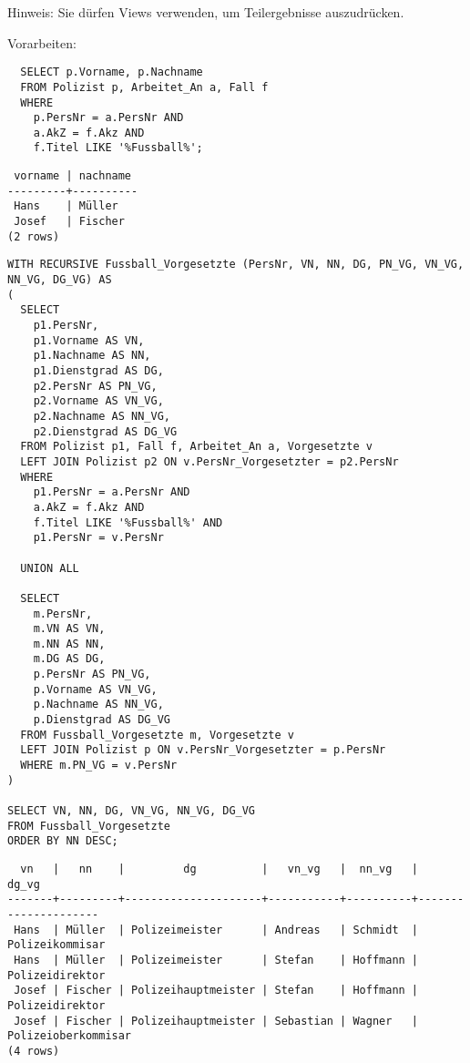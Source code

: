 \documentclass{bschlangaul-aufgabe}
\begin{document}
\begin{enumerate}
Hinweis: Sie dürfen Views verwenden, um Teilergebnisse auszudrücken.

\begin{liAntwort}
Vorarbeiten:
\begin{verbatim}
  SELECT p.Vorname, p.Nachname
  FROM Polizist p, Arbeitet_An a, Fall f
  WHERE
    p.PersNr = a.PersNr AND
    a.AkZ = f.Akz AND
    f.Titel LIKE '%Fussball%';
\end{verbatim}

\begin{verbatim}
 vorname | nachname
---------+----------
 Hans    | Müller
 Josef   | Fischer
(2 rows)
\end{verbatim}


\begin{verbatim}
WITH RECURSIVE Fussball_Vorgesetzte (PersNr, VN, NN, DG, PN_VG, VN_VG, NN_VG, DG_VG) AS
(
  SELECT
    p1.PersNr,
    p1.Vorname AS VN,
    p1.Nachname AS NN,
    p1.Dienstgrad AS DG,
    p2.PersNr AS PN_VG,
    p2.Vorname AS VN_VG,
    p2.Nachname AS NN_VG,
    p2.Dienstgrad AS DG_VG
  FROM Polizist p1, Fall f, Arbeitet_An a, Vorgesetzte v
  LEFT JOIN Polizist p2 ON v.PersNr_Vorgesetzter = p2.PersNr
  WHERE
    p1.PersNr = a.PersNr AND
    a.AkZ = f.Akz AND
    f.Titel LIKE '%Fussball%' AND
    p1.PersNr = v.PersNr

  UNION ALL

  SELECT
    m.PersNr,
    m.VN AS VN,
    m.NN AS NN,
    m.DG AS DG,
    p.PersNr AS PN_VG,
    p.Vorname AS VN_VG,
    p.Nachname AS NN_VG,
    p.Dienstgrad AS DG_VG
  FROM Fussball_Vorgesetzte m, Vorgesetzte v
  LEFT JOIN Polizist p ON v.PersNr_Vorgesetzter = p.PersNr
  WHERE m.PN_VG = v.PersNr
)

SELECT VN, NN, DG, VN_VG, NN_VG, DG_VG
FROM Fussball_Vorgesetzte
ORDER BY NN DESC;
\end{verbatim}

\begin{verbatim}
  vn   |   nn    |         dg          |   vn_vg   |  nn_vg   |        dg_vg
-------+---------+---------------------+-----------+----------+---------------------
 Hans  | Müller  | Polizeimeister      | Andreas   | Schmidt  | Polizeikommisar
 Hans  | Müller  | Polizeimeister      | Stefan    | Hoffmann | Polizeidirektor
 Josef | Fischer | Polizeihauptmeister | Stefan    | Hoffmann | Polizeidirektor
 Josef | Fischer | Polizeihauptmeister | Sebastian | Wagner   | Polizeioberkommisar
(4 rows)
\end{verbatim}


\end{liAntwort}
\end{enumerate}
\end{document}
